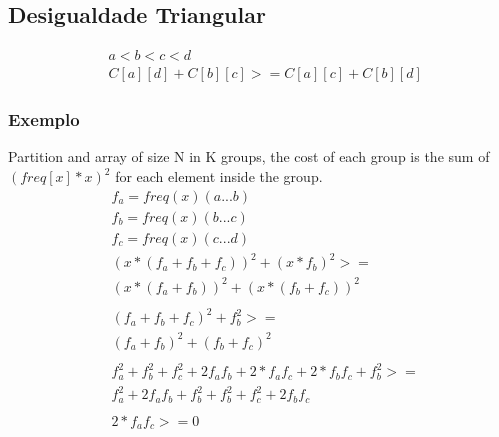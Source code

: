 \subsection{Desigualdade Triangular}
\begin{align*}
	&a < b < c < d \\
	&C[a][d] + C[b][c] >= C[a][c] + C[b][d]
\end{align*}
\subsubsection{Exemplo}
 Partition and array of size N in K groups, the cost of each group is the sum of $(freq[x] * x)^2$ 
for each element inside the group.
\begin{align*}
	&f_a = freq(x)(a...b) \\
	&f_b = freq(x)(b...c) \\
	&f_c = freq(x)(c...d) \\
	&(x * (f_a + f_b + f_c))^2 + (x * f_b)^2 >= \\
	&(x * (f_a + f_b))^2 + (x * (f_b + f_c))^2 \\
	\\
	&(f_a + f_b + f_c)^2 + f_b^2 >= \\
	&(f_a + f_b)^2 + (f_b + f_c)^2 \\
	\\
	& f_a^2 + f_b^2 + f_c^2 + 2f_af_b + 2*f_af_c + 2*f_bf_c + f_b^2 >= \\
	&f_a^2 + 2f_af_b + f_b^2 + f_b^2 + f_c^2 + 2f_bf_c\\
	\\
	& 2*f_af_c >= 0
\end{align*}


